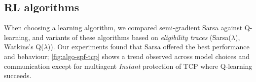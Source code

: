\documentclass[10pt, times, conference, letterpaper]{IEEEtran}
\begin{document}
%

\subsection{RL algorithms}
When choosing a learning algorithm, we compared semi-gradient Sarsa against Q-learning, and variants of these algorithms based on \emph{eligibility traces} (Sarsa($\lambda$), Watkins's Q($\lambda$)).
Our experiments found that Sarsa offered the best performance and behaviour; \cref{fig:algo-spf-tcp} shows a trend observed across model choices and communication except for multiagent \emph{Instant} protection of TCP where Q-learning succeeds.
\end{document}
